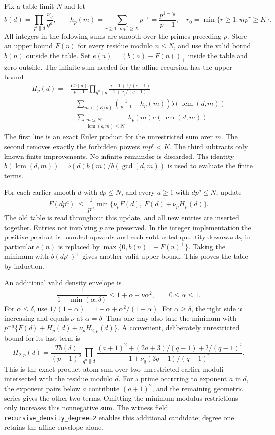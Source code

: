\documentclass[11pt]{article}
\begin{document}
Fix a table limit $N$ and let
\[
 b(d)=\prod_{q^a\parallel d}\frac{\nu_q}{q^a},\qquad
 h_p(m)=\sum_{r\geq1:\,mp^r\geq K}p^{-r}
       =\frac{p^{1-r_0}}{p-1},
 \quad r_0=\min\{r\geq1:mp^r\geq K\}.
\]
All integers in the following sums are smooth over the primes preceding
$p$. Store an upper bound $F(n)$ for every residue modulo $n\leq N$,
and use the valid bound $b(n)$ outside the table. Set
$e(n)=(b(n)-F(n))_+$ inside the table and zero outside. The infinite sum
needed for the affine recursion has the upper bound
\begin{align*}
 H_p(d)={}&\frac{C b(d)}{p-1}
 \prod_{q^a\parallel d}
 \frac{a+1+1/(q-1)}{1+\nu_q/(q-1)}\\
 &-\sum_{m<(K/p)}\left(\frac1{p-1}-h_p(m)\right)
                    b(\operatorname{lcm}(d,m))\\
 &-\sum_{\substack{m\leq N\\\operatorname{lcm}(d,m)\leq N}}
       h_p(m)e(\operatorname{lcm}(d,m)).
\end{align*}
The first line is an exact Euler product for the unrestricted sum over
$m$. The second removes exactly the forbidden powers $mp^r<K$.
The third subtracts only known finite improvements. No infinite remainder
is discarded. The identity
$b(\operatorname{lcm}(d,m))=b(d)b(m)/b(\gcd(d,m))$
is used to evaluate the finite terms.

For each earlier-smooth $d$ with $dp\leq N$, and every $a\geq1$ with
$dp^a\leq N$, update
\[
 F(dp^a)\ \leq\ \frac1{p^a}
       \min\{\nu_p F(d),\ F(d)+\nu_p H_p(d)\}.
\]
The old table is read throughout this update, and all new entries are
inserted together. Entries not involving $p$ are preserved. In the
integer implementation the positive product is rounded upwards and each
subtracted quantity downwards; in particular $e(n)$ is replaced by
$\max\{0,b(n)^--F(n)^+\}$. Taking the minimum with $b(dp^a)^+$ gives
another valid upper bound. This proves the table by induction.

An additional valid density envelope is
\[
 \frac1{1-\min(\alpha,\delta)}
 \leq 1+\alpha+\nu\alpha^2,\qquad 0\leq\alpha\leq1.
\]
For $\alpha\leq\delta$, use
$1/(1-\alpha)=1+\alpha+\alpha^2/(1-\alpha)$.
For $\alpha\geq\delta$, the right side is increasing and equals $\nu$
at $\alpha=\delta$. Thus one may also take the minimum with
$p^{-a}\{F(d)+H_p(d)+\nu_p H_{2,p}(d)\}$. A convenient, deliberately
unrestricted bound for its last term is
\[
 H_{2,p}(d)=\frac{T b(d)}{(p-1)^2}
 \prod_{q^a\parallel d}
 \frac{(a+1)^2+(2a+3)/(q-1)+2/(q-1)^2}
      {1+\nu_q(3q-1)/(q-1)^2}.
\]
This is the exact product-atom sum over two unrestricted earlier moduli
intersected with the residue modulo $d$. For a prime occurring to exponent
$a$ in $d$, the exponent pairs below $a$ contribute $(a+1)^2$, and the
remaining geometric series gives the other two terms. Omitting the
minimum-modulus restrictions only increases this nonnegative sum.
The witness field \texttt{recursive\_density\_degree=2} enables this
additional candidate; degree one retains the affine envelope alone.
\end{document}
